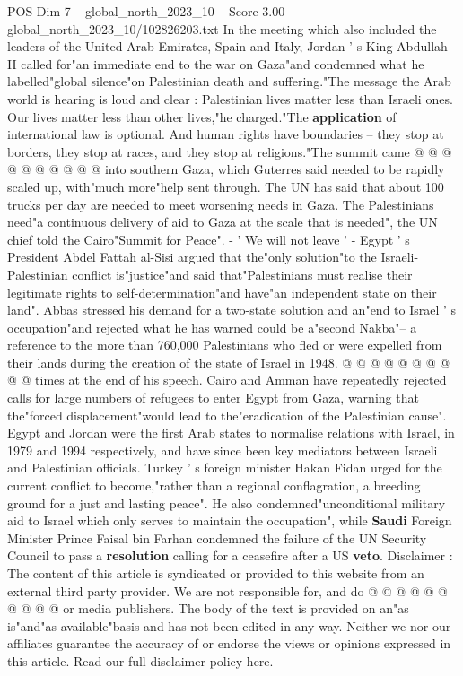\begin{textsample}{POS Dim 7 – global\_north\_2023\_10 – Score 3.00 – global\_north\_2023\_10/102826203.txt}
In the meeting which also included the leaders of the United Arab Emirates, Spain and Italy, Jordan ' s King Abdullah II called for"an immediate end to the war on Gaza"and condemned what he labelled"global silence"on Palestinian death and suffering."The message the Arab world is hearing is loud and clear : Palestinian lives matter less than Israeli ones.
Our lives matter less than other lives,"he charged."The \textbf{application} of international law is optional.
And human rights have boundaries -- they stop at borders, they stop at races, and they stop at religions."The summit came @ @ @ @ @ @ @ @ @ @ into southern Gaza, which Guterres said needed to be rapidly scaled up, with"much more"help sent through.
The UN has said that about 100 trucks per day are needed to meet worsening needs in Gaza.
The Palestinians need"a continuous delivery of aid to Gaza at the scale that is needed", the UN chief told the Cairo"Summit for Peace". - ' We will not leave ' - Egypt ' s President Abdel Fattah al-Sisi argued that the"only solution"to the Israeli-Palestinian conflict is"justice"and said that"Palestinians must realise their legitimate rights to self-determination"and have"an independent state on their land".
Abbas stressed his demand for a two-state solution and an"end to Israel ' s occupation"and rejected what he has warned could be a"second Nakba"-- a reference to the more than 760,000 Palestinians who fled or were expelled from their lands during the creation of the state of Israel in 1948. @ @ @ @ @ @ @ @ @ @ times at the end of his speech.
Cairo and Amman have repeatedly rejected calls for large numbers of refugees to enter Egypt from Gaza, warning that the"forced displacement"would lead to the"eradication of the Palestinian cause".
Egypt and Jordan were the first Arab states to normalise relations with Israel, in 1979 and 1994 respectively, and have since been key mediators between Israeli and Palestinian officials.
Turkey ' s foreign minister Hakan Fidan urged for the current conflict to become,"rather than a regional conflagration, a breeding ground for a just and lasting peace".
He also condemned"unconditional military aid to Israel which only serves to maintain the occupation", while \textbf{Saudi} Foreign Minister Prince Faisal bin Farhan condemned the failure of the UN Security Council to pass a \textbf{resolution} calling for a ceasefire after a US \textbf{veto}.
Disclaimer : The content of this article is syndicated or provided to this website from an external third party provider.
We are not responsible for, and do @ @ @ @ @ @ @ @ @ @ or media publishers.
The body of the text is provided on an"as is"and"as available"basis and has not been edited in any way.
Neither we nor our affiliates guarantee the accuracy of or endorse the views or opinions expressed in this article.
Read our full disclaimer policy here.

\end{textsample}
